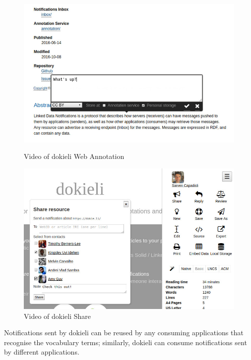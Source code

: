 \documentclass[a4paper]{llncs}
\begin{document}
\begin{figure}
  \begin{minipage}[b]{.49\textwidth}
    \includegraphics[width=\textwidth]{media/images/dokieli-annotation}
    \caption{Video of dokieli Web Annotation}
    \label{fig:video-annotation}
  \end{minipage}
  \hfill
  \begin{minipage}[b]{.49\textwidth}
    \includegraphics[width=\textwidth]{media/images/dokieli-share}
    \caption{Video of dokieli Share}
    \label{fig:video-share}
  \end{minipage}
\end{figure}  






\par Notifications sent by dokieli can be reused by any consuming applications that recognise the vocabulary terms; similarly, dokieli can consume notifications sent by different applications.
\end{document}
